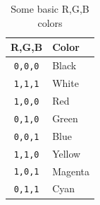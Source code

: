 \begin{table}[htp]
\caption{Some basic R,G,B colors}
\begin{center}
\begin{tabular}{|c|l|}
\hline
\textbf{R,G,B} & \textbf{Color}\\
\hline
\texttt{0,0,0}  & Black\\
\texttt{1,1,1}  & White\\
\texttt{1,0,0}  & Red\\
\texttt{0,1,0}  & Green\\
\texttt{0,0,1}  & Blue\\
\texttt{1,1,0}  & Yellow\\
\texttt{1,0,1}  & Magenta\\
\texttt{0,1,1}  & Cyan\\
\hline
\end{tabular}
\end{center}
\label{rgbcolors}
\end{table}


